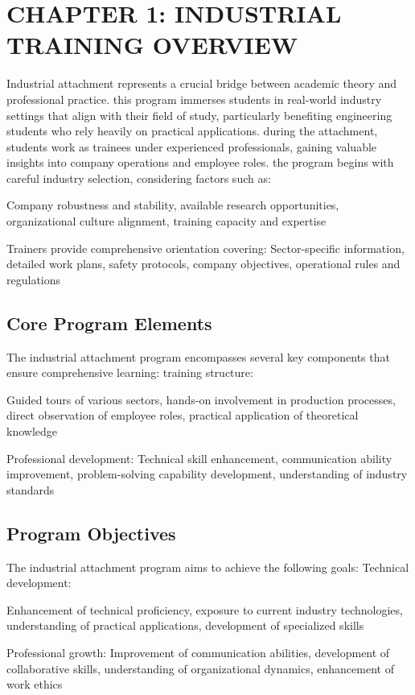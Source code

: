 \section{CHAPTER 1: INDUSTRIAL TRAINING OVERVIEW}
Industrial attachment represents a crucial bridge between academic theory and professional practice. this program immerses students in real-world industry settings that align with their field of study, particularly benefiting engineering students who rely heavily on practical applications. during the attachment, students work as trainees under experienced professionals, gaining valuable insights into company operations and employee roles. the program begins with careful industry selection, considering factors such as:

Company robustness and stability, available research opportunities, organizational culture alignment, training capacity and expertise

Trainers provide comprehensive orientation covering: Sector-specific information, detailed work plans, safety protocols, company objectives, operational rules and regulations

\subsection{Core Program Elements}
The industrial attachment program encompasses several key components that ensure comprehensive learning:
training structure:

Guided tours of various sectors, hands-on involvement in production processes, direct observation of employee roles, practical application of theoretical knowledge

Professional development: Technical skill enhancement, communication ability improvement, problem-solving capability development, understanding of industry standards

\subsection{Program Objectives}
The industrial attachment program aims to achieve the following goals:
Technical development:

Enhancement of technical proficiency, exposure to current industry technologies, understanding of practical applications, development of specialized skills

Professional growth: Improvement of communication abilities, development of collaborative skills, understanding of organizational dynamics, enhancement of work ethics

